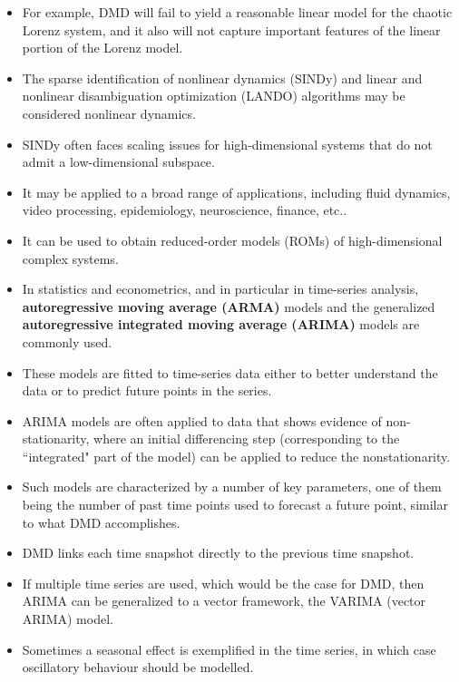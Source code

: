 \documentclass[hyperref={pdfpagemode=FullScreen},aspectratio=169]{beamer}
\begin{document}
\begin{frame}{}
\begin{itemize}
\setlength\itemsep{1em}
\item For example, DMD will fail to yield a reasonable linear model for the chaotic Lorenz system, and it also will not capture important features of the linear portion of the Lorenz model.
\item The sparse identification of nonlinear dynamics (SINDy) and linear and nonlinear disambiguation optimization (LANDO) algorithms may be considered nonlinear dynamics.
\item  SINDy often faces scaling issues for high-dimensional systems that do not admit a low-dimensional subspace.
\item It may be applied to a broad range of applications, including fluid dynamics, video processing, epidemiology, neuroscience, finance, etc..
\item It can be used to obtain reduced-order models (ROMs) of high-dimensional complex systems.
\item In statistics and econometrics, and in particular in time-series analysis, \textbf{autoregressive moving average (ARMA)} models and the generalized \textbf{autoregressive integrated moving average (ARIMA)} models are commonly used.
\end{itemize}
\end{frame}
\begin{frame}{}
\begin{itemize}
\setlength\itemsep{1em}
\item These models are fitted to time-series data either to better understand the data or to predict future points in the series.
\item ARIMA models are often applied to data that shows evidence of non-stationarity, where an initial differencing step (corresponding to the ``integrated" part of the model) can be applied to reduce the nonstationarity.
\item Such models are characterized by a number of key parameters, one of them being the number of past time points used to forecast a future point, similar to what DMD accomplishes.
\item DMD links each time snapshot directly to the previous time snapshot.
\item  If multiple time series are used, which would be the case for DMD, then ARIMA can be generalized to a vector framework, the VARIMA (vector ARIMA) model.
\item Sometimes a seasonal effect is exemplified in the time series, in which case oscillatory behaviour should be modelled.
\end{itemize}
\end{frame}
\end{document}
